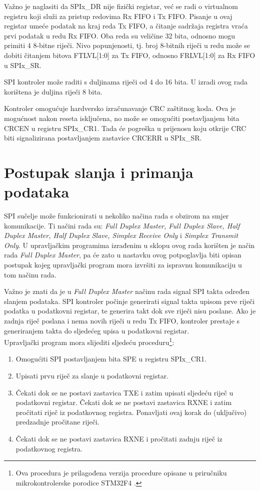 		Važno je naglasiti da SPIx\_DR nije fizički registar, već se radi o virtualnom registru koji služi za pristup redovima Rx FIFO i Tx FIFO. Pisanje u ovaj registar umeće podatak na kraj reda Tx FIFO, a čitanje sadržaja registra vraća prvi podatak u redu Rx FIFO. Oba reda su veličine 32 bita, odnosno mogu primiti 4 8-bitne riječi. Nivo popunjenosti, tj. broj 8-bitnih riječi u redu može se dobiti čitanjem bitova FTLVL[1:0] za Tx FIFO, odnosno FRLVL[1:0] za Rx FIFO u SPIx\_SR. 
		
		SPI kontroler može raditi s duljinama riječi od 4 do 16 bita. U izradi ovog rada korištena je duljina riječi 8 bita.
		
		Kontroler omogućuje hardversko izračunavanje CRC zaštitnog koda. Ova je mogućnost nakon reseta isključena, no može se omogućiti postavljanjem bita CRCEN u registru SPIx\_CR1. Tada će pogreška u prijenosu koju otkrije CRC biti signalizirana postavljanjem zastavice CRCERR u SPIx\_SR.
		
	\section{Postupak slanja i primanja podataka}
		
		SPI sučelje može funkcionirati u nekoliko načina rada s obzirom na smjer komunikacije. Ti načini rada su: \textit{Full Duplex Master, Full Duplex Slave, Half Duplex Master, Half Duplex Slave, Simplex Receive Only} i \textit{Simplex Transmit Only}. U upravljačkim programima izrađenim u sklopu ovog rada korišten je način rada \textit{Full Duplex Master}, pa će zato u nastavku ovog potpoglavlja biti opisan postupak kojeg upravljački program mora izvršiti za ispravnu komunikaciju u tom načinu rada.
		
		Važno je znati da je u \textit{Full Duplex Master} načinu rada signal SPI takta određen slanjem podataka. SPI kontroler počinje generirati signal takta upisom prve riječi podatka u podatkovni registar, te generira takt dok sve riječi nisu poslane. Ako je zadnja riječ poslana i nema novih riječi u redu Tx FIFO, kontroler prestaje s generiranjem takta do sljedećeg upisa u podatkovni registar. \\
		
		Upravljački program mora slijediti sljedeću proceduru\footnote{Ova procedura je prilagođena verzija procedure opisane u priručniku mikrokontrolerske porodice STM32F4 \citep[str.~887]{stm32f4}.}:
		\begin{enumerate}
			\item Omogućiti SPI postavljanjem bita SPE u registru SPIx\_CR1.
			\item Upisati prvu riječ za slanje u podatkovni registar.
			\item Čekati dok se ne postavi zastavica TXE i zatim upisati sljedeću riječ u podatkovni registar. Čekati dok se ne postavi zastavica RXNE i zatim pročitati riječ iz podatkovnog registra. Ponavljati ovaj korak do (uključivo) predzadnje pročitane riječi.
			\item  Čekati dok se ne postavi zastavica RXNE i pročitati zadnju riječ iz podatkovnog registra.
		\end{enumerate}
	
